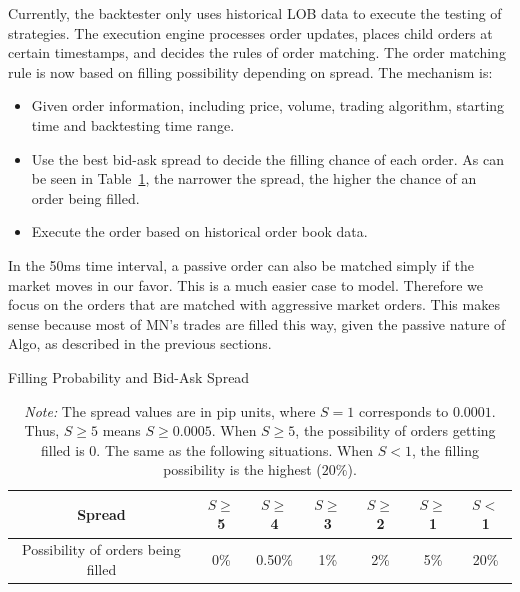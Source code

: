 Currently, the backtester only uses historical LOB data to execute the testing of strategies. 
The execution engine processes order updates, places child orders at certain timestamps, and decides the rules of order matching. The order matching rule is now based on filling possibility depending on spread. The mechanism is:
\begin{itemize}
    \item Given order information, including price, volume, trading algorithm, starting time and backtesting time range.
    \item Use the best bid-ask spread to decide the filling chance of each order. As can be seen in Table~\ref{tab:filling_spread}, the narrower the spread, the higher the chance of an order being filled.
    \item Execute the order based on historical order book data.
\end{itemize} 

In the 50ms time interval, a passive order can also be matched simply if the market moves in our favor. This is a much easier case to model. Therefore we focus on the orders that are matched with aggressive market orders. This makes sense because most of MN's trades are filled this way, given the passive nature of Algo, as described in the previous sections.
\begin{table}[tbp]
    \centering
    \caption{Filling Probability and Bid-Ask Spread}
    \caption*{\textit{Note:} The spread values are in pip units, where $S=1$ corresponds to $0.0001$. Thus, $S \geq 5$ means $S \geq 0.0005$. When $S \geq 5$, the possibility of orders getting filled is $0$. The same as the following situations. When $S < 1$, the filling possibility is the highest ($20\%$).}
    \begin{tabular}{c|c|c|c|c|c|c}
        \hline
        Spread & $S \geq$ 5 & $S \geq$ 4 & $S \geq$ 3 & $S \geq$ 2 & $S \geq$ 1 & $S <$ 1 \\
        \hline
        Possibility of orders being filled & 0\% & 0.50\% & 1\% & 2\% & 5\% & 20\% \\
        \hline
    \end{tabular}
    \label{tab:filling_spread}
\end{table}
